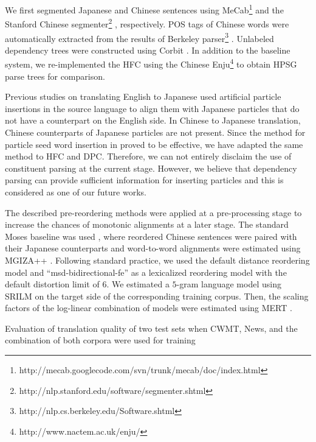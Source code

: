 \documentclass[english]{jnlp_1.4}
\begin{document}
We first segmented Japanese and Chinese sentences using 
MeCab\footnote{http://mecab.googlecode.com/svn/trunk/mecab/doc/index.html} \cite{TK2000}
and the Stanford Chinese segmenter\footnote{http://nlp.stanford.edu/software/segmenter.shtml} \cite{PCC2008}, respectively.
POS tags of Chinese words were automatically extracted from the results of Berkeley 
parser\footnote{http://nlp.cs.berkeley.edu/Software.shtml} \cite{SP2006}.
Unlabeled dependency trees were constructed using Corbit \cite{Corbit2011}.
In addition to the baseline system, we re-implemented the HFC \cite{DH2012} 
using the Chinese Enju\footnote{http://www.nactem.ac.uk/enju/} \cite{KY2011} to obtain HPSG parse trees for comparison.

Previous studies on translating English to Japanese \cite{HI2010}
used artificial particle insertions in the source language to align them with
Japanese particles that do not have a counterpart on the English side.
In Chinese to Japanese translation, Chinese counterparts of Japanese particles are not present.
Since the method for particle seed word insertion in \cite{Isozaki2012} proved to be effective,
we have adapted the same method to HFC and DPC.
Therefore, we can not entirely disclaim the use of constituent parsing at 
the current stage. However, we believe that dependency parsing can provide sufficient
information for inserting particles and this is considered as one of our
future works.

The described pre-reordering methods were applied at a pre-processing stage
to increase the chances of monotonic alignments at a later stage.
The standard Moses baseline was used \cite{MOSES2007}, where reordered 
Chinese sentences were paired with their Japanese counterparts and word-to-word 
alignments were estimated using MGIZA++ \cite{MGIZA2008}.
Following standard practice, we used the default distance reordering model
and ``msd-bidirectional-fe'' as a lexicalized reordering model 
with the default distortion limit of $6$.
We estimated a $5$-gram language model using SRILM  on 
the target side of the corresponding training corpus.
Then, the scaling factors of the log-linear combination of models were estimated
using MERT .

\begin{table}[b]
\caption{Evaluation of translation quality of two test sets when CWMT, News, and the 
combination of both corpora were used for training}
\label{tab:results}
\vspace{8pt}

\end{table}
\end{document}
